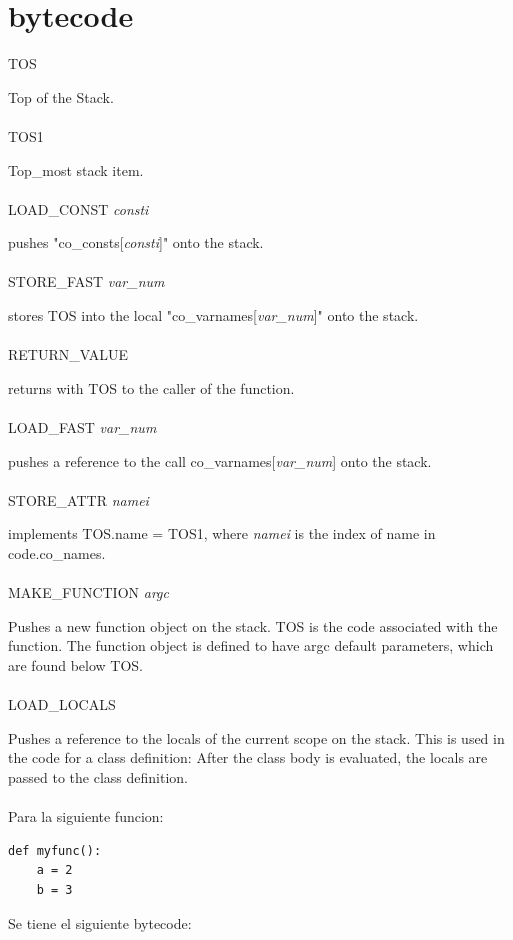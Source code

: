 \documentclass[10pt,a4paper]{article}
\begin{document}
\section{bytecode}

TOS

	Top of the Stack.\\\\
TOS1

	Top\_most stack item.\\\\
LOAD\_CONST \textit{consti}

	pushes "co\_consts[\textit{consti}]" onto the stack. \\\\
STORE\_FAST \textit{var\_num}

	stores TOS into the local "co\_varnames[\textit{var\_num}]" onto the stack.\\\\
RETURN\_VALUE

	returns with TOS to the caller of the function.\\\\
LOAD\_FAST \textit{var\_num}

	pushes a reference to the call co\_varnames[\textit{var\_num}] onto the stack.\\\\
STORE\_ATTR \textit{namei}

	implements TOS.name = TOS1, where \textit{namei} is the index of name in code.co\_names.\\\\
MAKE\_FUNCTION \textit{argc}

    Pushes a new function object on the stack. TOS is the code associated with the function. The function object is defined to have argc default parameters, which are found below TOS.\\\\
LOAD\_LOCALS

    Pushes a reference to the locals of the current scope on the stack. This is used in the code for a class definition: After the class body is evaluated, the locals are passed to the class definition.\\\\

Para la siguiente funcion:
\begin{verbatim}
def myfunc():
    a = 2
    b = 3
\end{verbatim}

Se tiene el siguiente bytecode:
\end{document}
